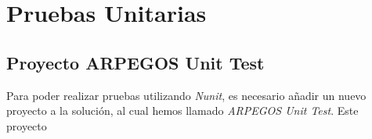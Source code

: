 
\section{Pruebas Unitarias}
\subsection{Proyecto ARPEGOS Unit Test}
Para poder realizar pruebas utilizando \textit{Nunit}, es necesario añadir un nuevo proyecto a la solución, al cual hemos llamado
\textit{ARPEGOS Unit Test}. Este proyecto  